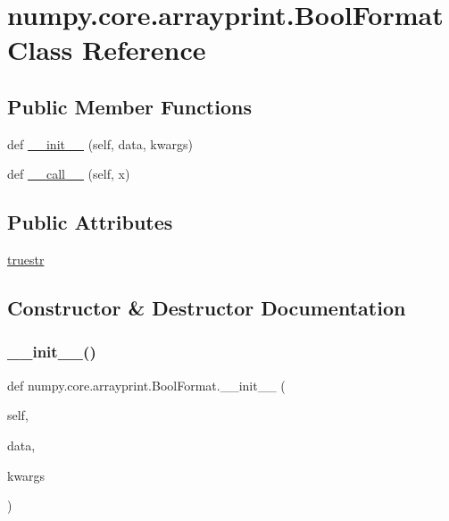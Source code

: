 \hypertarget{classnumpy_1_1core_1_1arrayprint_1_1BoolFormat}{}\section{numpy.\+core.\+arrayprint.\+Bool\+Format Class Reference}
\label{classnumpy_1_1core_1_1arrayprint_1_1BoolFormat}
\subsection*{Public Member Functions}
\begin{DoxyCompactItemize}
\item 
def \hyperlink{classnumpy_1_1core_1_1arrayprint_1_1BoolFormat_aeb047d39c6916c8c5e0eaa912ec37254}{\+\_\+\+\_\+init\+\_\+\+\_\+} (self, data, kwargs)
\item 
def \hyperlink{classnumpy_1_1core_1_1arrayprint_1_1BoolFormat_ad38f3c199ca9c0891e15f4d0fce3b734}{\+\_\+\+\_\+call\+\_\+\+\_\+} (self, x)
\end{DoxyCompactItemize}
\subsection*{Public Attributes}
\begin{DoxyCompactItemize}
\item 
\hyperlink{classnumpy_1_1core_1_1arrayprint_1_1BoolFormat_aef74440657ce296594b6c37419890299}{truestr}
\end{DoxyCompactItemize}


\subsection{Constructor \& Destructor Documentation}
\mbox{\label{classnumpy_1_1core_1_1arrayprint_1_1BoolFormat_aeb047d39c6916c8c5e0eaa912ec37254}} 
\subsubsection{\texorpdfstring{\+\_\+\+\_\+init\+\_\+\+\_\+()}{\_\_init\_\_()}}
{\footnotesize\ttfamily def numpy.\+core.\+arrayprint.\+Bool\+Format.\+\_\+\+\_\+init\+\_\+\+\_\+ (\begin{DoxyParamCaption}\item[{}]{self,  }\item[{}]{data,  }\item[{}]{kwargs }\end{DoxyParamCaption})}



